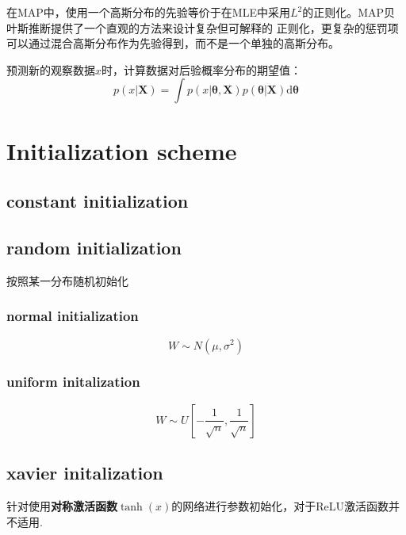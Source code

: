 在MAP中，使用一个高斯分布的先验等价于在MLE中采用$L^2$的正则化。MAP贝叶斯推断提供了一个直观的方法来设计复杂但可解释的
正则化，更复杂的惩罚项可以通过混合高斯分布作为先验得到，而不是一个单独的高斯分布。


预测新的观察数据$x$时，计算数据对后验概率分布的期望值：
\begin{equation}
    p(x | \mathbf{X}) = \int p(x | \boldsymbol{\theta}, \mathbf{X})p(\boldsymbol{\theta}|\mathbf{X})\mathrm{d}\boldsymbol{\theta}
\end{equation}
\section{Initialization scheme}
\subsection{constant initialization}

\subsection{random initialization}
按照某一分布随机初始化
\subsubsection{normal initialization}
\begin{equation}
    W \sim N(\mu, \sigma^2)
\end{equation}

\subsubsection{uniform initalization}
\begin{equation}
    W \sim U[-\frac{1}{\sqrt{n}}, \frac{1}{\sqrt{n}}]
\end{equation}

\subsection{xavier initalization}
针对使用\textbf{对称激活函数}$\tanh(x)$的网络进行参数初始化，对于ReLU激活函数并不适用\cite{Glorot2010}.


